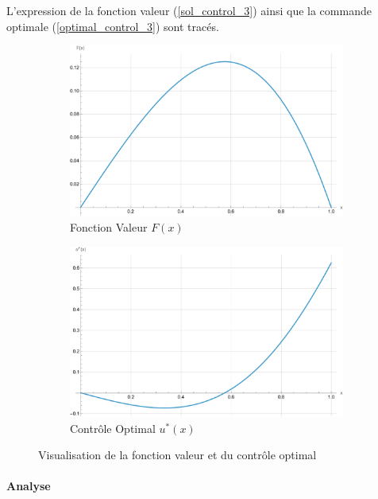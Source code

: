 L'expression de la fonction valeur (\ref{sol_control_3}) ainsi que la commande optimale (\ref{optimal_control_3}) sont tracés.
\begin{figure}[htb]
    \centering
    \begin{subfigure}{0.49\linewidth}
        \includegraphics[width=\linewidth]{img/validation/P3/p3_value.pdf}
        \caption{Fonction Valeur $F(x)$}\label{fig:ValueVisualisation3}
    \end{subfigure}
    \hfill
    \begin{subfigure}{0.49\linewidth}
        \includegraphics[width=\linewidth]{img/validation/P3/p3_control.pdf}
        \caption{Contrôle Optimal $u^*(x)$}\label{fig:ControlVisualisation3}
    \end{subfigure}
    \caption{Visualisation de la fonction valeur et du contrôle optimal}\label{fig:ValueControlComparison3}
\end{figure}
\FloatBarrier\paragraph{Analyse}\phantom{}\\
